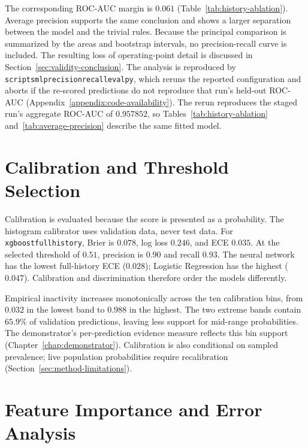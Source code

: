The corresponding ROC-AUC margin is \(0.061\)
(Table~\ref{tab:history-ablation}). Average precision supports the same conclusion
and shows a larger separation between the model and the trivial rules. Because
the principal comparison is summarized by the areas and bootstrap intervals, no
precision-recall curve is included. The resulting loss of operating-point detail
is discussed in Section~\ref{sec:validity-conclusion}. The analysis is reproduced
by
\texttt{scripts\sslash ml\sslash precision\su recall\su eval\sdot py}, which
reruns the reported configuration and aborts if the re-scored predictions do not
reproduce that run's held-out ROC-AUC
(Appendix~\ref{appendix:code-availability}). The rerun reproduces the staged
run's aggregate ROC-AUC of \(0.957852\), so
Tables~\ref{tab:history-ablation} and~\ref{tab:average-precision} describe the
same fitted model.

\section{Calibration and Threshold Selection}
\label{sec:results-calibration}

Calibration is evaluated because the score is presented as a probability. The
histogram calibrator uses validation data, never test data. For
\texttt{xgboost\sdash full\sdash history}, Brier is \(0.078\), log loss
\(0.246\), and ECE \(0.035\). At the selected threshold of \(0.51\), precision
is \(0.90\) and recall \(0.93\). The neural network has the lowest full-history
ECE (\(0.028\)); Logistic Regression has the highest (\(0.047\)). Calibration
and discrimination therefore order the models differently.

Empirical inactivity increases monotonically across the ten calibration bins,
from \(0.032\) in the lowest band to \(0.988\) in the highest. The two extreme
bands contain \(65.9\%\) of validation predictions, leaving less support for
mid-range probabilities. The demonstrator's per-prediction evidence measure
reflects this bin support (Chapter~\ref{chap:demonstrator}). Calibration is also
conditional on sampled prevalence; live population probabilities require
recalibration (Section~\ref{sec:method-limitations}).

\section{Feature Importance and Error Analysis}
\label{sec:results-features}

